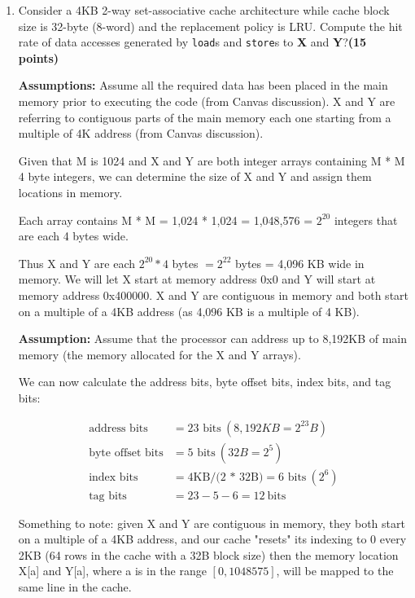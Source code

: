 \documentclass[a4paper, 11pt]{exam}
\begin{document}
\begin{enumerate}
\begin{enumerate}
\item Consider a 4KB 2-way set-associative cache architecture while cache block size is 32-byte (8-word) and the replacement policy is LRU. Compute the hit rate of data accesses generated by \texttt{load}s and \texttt{store}s to \textbf{X} and \textbf{Y}?\textbf{(15 points)}

\textbf{Assumptions:} Assume all the required data has been placed in the main memory prior to executing the code (from Canvas discussion). X and Y are referring to contiguous parts of the main memory each one starting from a multiple of 4K address (from Canvas discussion).

	Given that M is 1024 and X and Y are both integer arrays containing M * M 4 byte integers, we can determine the size of X and Y and assign them locations in memory. 
	
	Each array contains M * M = 1,024 * 1,024 = 1,048,576 = $2^{20}$ integers that are each 4 bytes wide. 
	
	Thus X and Y are each $2^{20} * 4$ bytes $= 2^{22}$ bytes = 4,096 KB wide in memory. We will let X start at memory address 0x0 and Y will start at memory address 0x400000. X and Y are contiguous in memory and both start on a multiple of a 4KB address (as 4,096 KB is a multiple of 4 KB).
	
\textbf{Assumption:} Assume that the processor can address up to 8,192KB of main memory (the memory allocated for the X and Y arrays).

We can now calculate the address bits, byte offset bits, index bits, and tag bits:

\begin{align*}
\text{address bits} &= \text{23 bits} \  (8,192KB = 2^{23} B) \\
\text{byte offset bits} &= \text{5 bits} \ (32B = 2^5) \\
\text{index bits} &= \text{4KB/(2 * 32B)} = \text{6 bits} \ (2^{6})\\
\text{tag bits} &= 23 - 5 - 6 = 12 \ \text{bits}         
\end{align*}

Something to note: given X and Y are contiguous in memory, they both start on a multiple of a 4KB address, and our cache "resets" its indexing to 0 every 2KB (64 rows in the cache with a 32B block size) then the memory location X[a] and Y[a], where a is in the range $[0, 1048575]$, will be mapped to the same line in the cache.


\end{enumerate}
\end{enumerate}
\end{document}
